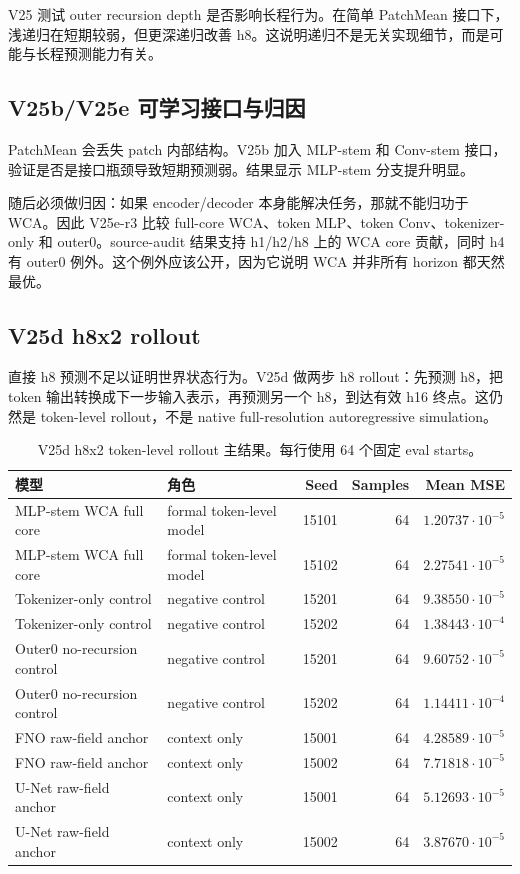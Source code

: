 \documentclass[11pt]{article}
\begin{document}
V25 测试 outer recursion depth 是否影响长程行为。在简单 PatchMean 接口下，浅递归在短期较弱，但更深递归改善 h8。这说明递归不是无关实现细节，而是可能与长程预测能力有关。

\subsection{V25b/V25e 可学习接口与归因}

PatchMean 会丢失 patch 内部结构。V25b 加入 MLP-stem 和 Conv-stem 接口，验证是否是接口瓶颈导致短期预测弱。结果显示 MLP-stem 分支提升明显。

随后必须做归因：如果 encoder/decoder 本身能解决任务，那就不能归功于 WCA。因此 V25e-r3 比较 full-core WCA、token MLP、token Conv、tokenizer-only 和 outer0。source-audit 结果支持 h1/h2/h8 上的 WCA core 贡献，同时 h4 有 outer0 例外。这个例外应该公开，因为它说明 WCA 并非所有 horizon 都天然最优。

\subsection{V25d h8x2 rollout}

直接 h8 预测不足以证明世界状态行为。V25d 做两步 h8 rollout：先预测 h8，把 token 输出转换成下一步输入表示，再预测另一个 h8，到达有效 h16 终点。这仍然是 token-level rollout，不是 native full-resolution autoregressive simulation。

\begin{table}[H]
\centering
\caption{V25d h8x2 token-level rollout 主结果。每行使用 64 个固定 eval starts。}
\begin{tabular}{llrrr}
\toprule
模型 & 角色 & Seed & Samples & Mean MSE \\
\midrule
MLP-stem WCA full core & formal token-level model & 15101 & 64 & $1.20737\cdot 10^{-5}$ \\
MLP-stem WCA full core & formal token-level model & 15102 & 64 & $2.27541\cdot 10^{-5}$ \\
Tokenizer-only control & negative control & 15201 & 64 & $9.38550\cdot 10^{-5}$ \\
Tokenizer-only control & negative control & 15202 & 64 & $1.38443\cdot 10^{-4}$ \\
Outer0 no-recursion control & negative control & 15201 & 64 & $9.60752\cdot 10^{-5}$ \\
Outer0 no-recursion control & negative control & 15202 & 64 & $1.14411\cdot 10^{-4}$ \\
FNO raw-field anchor & context only & 15001 & 64 & $4.28589\cdot 10^{-5}$ \\
FNO raw-field anchor & context only & 15002 & 64 & $7.71818\cdot 10^{-5}$ \\
U-Net raw-field anchor & context only & 15001 & 64 & $5.12693\cdot 10^{-5}$ \\
U-Net raw-field anchor & context only & 15002 & 64 & $3.87670\cdot 10^{-5}$ \\
\bottomrule
\end{tabular}
\end{table}
\end{document}
